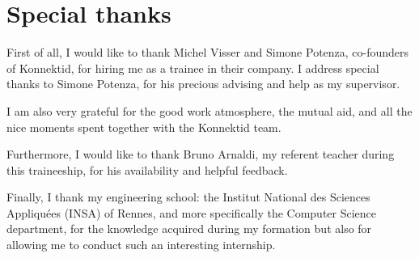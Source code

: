 \section{Special thanks}
\label{sec:thanks}


First of all, I would like to thank Michel {\sc Visser} and Simone {\sc Potenza}, co-founders of Konnektid, for hiring me as a trainee in their company.
I address special thanks to Simone {\sc Potenza}, for his precious advising and help as my supervisor.

I am also very grateful for the good work atmosphere, the mutual aid, and all the nice moments spent together with the Konnektid team.

Furthermore, I would like to thank Bruno {\sc Arnaldi}, my referent teacher during this traineeship, for his availability and helpful feedback.

Finally, I thank my engineering school: the \guillemotleft{} Institut National des Sciences Appliquées \guillemotright{} (INSA) of Rennes,
and more specifically the Computer Science department, for the knowledge acquired during my formation but also for allowing me to conduct such an interesting internship.
